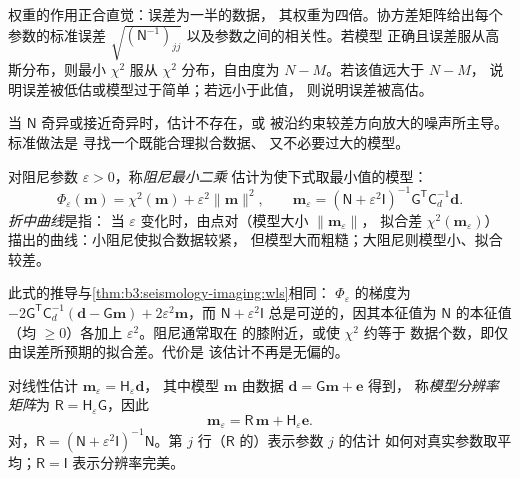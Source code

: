 权重的作用正合直觉：误差为一半的数据，
其权重为四倍。协方差矩阵给出每个参数的标准误差
$\sqrt{(\mathsf N^{-1})_{jj}}$ 以及参数之间的相关性。若模型
正确且误差服从高斯分布，则最小 $\chi^2$ 服从
$\chi^2$ 分布，自由度为 $N - M$。若该值远大于 $N - M$，
说明误差被低估或模型过于简单；若远小于此值，
则说明误差被高估。

当 $\mathsf N$ 奇异或接近奇异时，估计不存在，或
被沿约束较差方向放大的噪声所主导。标准做法是
寻找一个既能合理拟合数据、
又不必要过大的模型。

\begin{definition}\label{def:b3:seismology-imaging:damped}
对阻尼参数 $\varepsilon > 0$，称\emph{阻尼最小二乘}
估计为使下式取最小值的模型：
\[
  \Phi_\varepsilon(\mathbf m) = \chi^2(\mathbf m) + \varepsilon^2\|\mathbf m\|^2 ,
  \qquad
  \mathbf m_\varepsilon = \left(\mathsf N + \varepsilon^2\mathsf I\right)^{-1}
  \mathsf G^{\mathsf T}\mathsf C_d^{-1}\mathbf d .
\]
\emph{折中曲线}是指：
当 $\varepsilon$ 变化时，由点对（模型大小 $\|\mathbf m_\varepsilon\|$，
拟合差 $\chi^2(\mathbf m_\varepsilon)$）描出的曲线：小阻尼使拟合数据较紧，
但模型大而粗糙；大阻尼则模型小、拟合较差。
\end{definition}

此式的推导与\cref{thm:b3:seismology-imaging:wls}相同：
$\Phi_\varepsilon$ 的梯度为 $-2\mathsf G^{\mathsf T}\mathsf C_d^{-1}(\mathbf d -
\mathsf G\mathbf m) + 2\varepsilon^2\mathbf m$，而 $\mathsf N + \varepsilon^2
\mathsf I$ 总是可逆的，因其本征值为
$\mathsf N$ 的本征值（均 $\ge 0$）各加上 $\varepsilon^2$。阻尼通常取在
的膝附近，或使 $\chi^2$ 约等于
数据个数，即仅由误差所预期的拟合差。代价是
该估计不再是无偏的。

\begin{definition}[模型分辨率矩阵]\label{def:b3:seismology-imaging:resolution}
对线性估计 $\mathbf m_\varepsilon = \mathsf H_\varepsilon \mathbf d$，
其中模型 $\mathbf m$ 由数据 $\mathbf d = \mathsf G\mathbf m + \mathbf e$ 得到，
称\emph{模型分辨率矩阵}为
$\mathsf R = \mathsf H_\varepsilon\mathsf G$，因此
\[
  \mathbf m_\varepsilon = \mathsf R\,\mathbf m + \mathsf H_\varepsilon\mathbf e .
\]
对，$\mathsf R = (\mathsf N + \varepsilon^2\mathsf I)^{-1}
\mathsf N$。第 $j$ 行（$\mathsf R$ 的）表示参数 $j$ 的估计
如何对真实参数取平均；$\mathsf R = \mathsf I$ 表示分辨率完美。
\end{definition}

